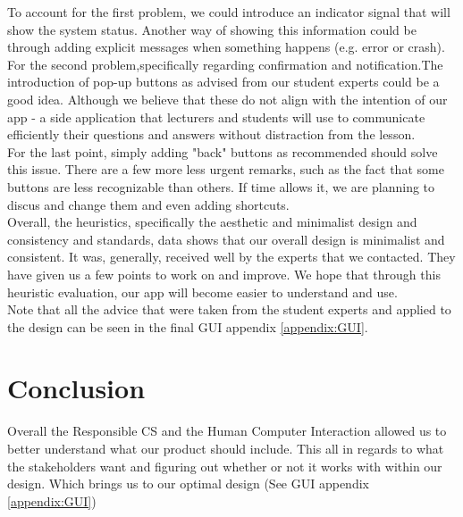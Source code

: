\documentclass{article}
\begin{document}
    To account for the first problem, we could introduce an indicator signal that will show the system status. Another way of showing this information could be through adding explicit messages when something happens (e.g. error or crash).\\

    For the second problem,specifically regarding confirmation and notification.The introduction of pop-up buttons as advised from our student experts could be a good idea.  Although  we believe that these do not align with the intention of our app - a side application that lecturers and students will use to communicate efficiently their questions and answers without distraction from the lesson.\\

    For the last point, simply adding "back" buttons as recommended should solve this issue.
    There are a few more less urgent remarks, such as the fact that some buttons are less recognizable than others. If time allows it, we are planning to discus and change them and even adding shortcuts.\\

    Overall, the heuristics, specifically the aesthetic and minimalist design and consistency and standards, data shows that our overall design is minimalist and consistent. It was, generally, received well by the experts that we contacted. They have given us a few points to work on and improve. We hope that through this heuristic evaluation, our app will become easier to understand and use. \\

    Note that all the advice that were taken from the student experts and applied to the design can be seen in the final GUI appendix \ref{appendix:GUI}.

    \section{Conclusion}
    Overall the Responsible CS and the Human Computer Interaction allowed us to better understand what our product should include. This all in regards to what the stakeholders want and figuring out whether or not it works with within our design. Which brings us to our optimal design (See GUI appendix \ref{appendix:GUI})


    
    
\end{document}
